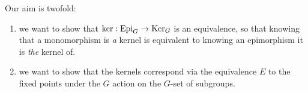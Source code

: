   Our aim is twofold:
  \begin{enumerate}
  \item we want to show that $\ker:\typeepi_G\to\typekernel_G$ is an equivalence, so that knowing that a monomorphism is \emph{a} kernel is equivalent to knowing an epimorphism it is \emph{the} kernel of.
  \item we want to show that the kernels correspond via the equivalence $E$ to the fixed points under the $G$ action on the $G$-set of subgroups.
  \end{enumerate}





